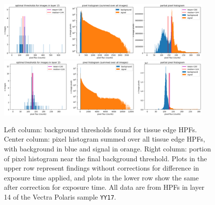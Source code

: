 \documentclass[letterpaper,11pt]{article}
\begin{document}
\begin{figure}[!ht]
\centering
\includegraphics[width=0.95\textwidth]{images/results/thresholding_pre_correction/YY17_layer_15_background_threshold_plots}
\includegraphics[width=0.95\textwidth]{images/results/thresholding_post_correction/YY17_layer_15_background_threshold_plots}
\caption{\footnotesize Left column: background thresholds found for tissue edge HPFs. Center column: pixel histogram summed over all tissue edge HPFs, with background in blue and signal in orange. Right column: portion of pixel histogram near the final background threshold. Plots in the upper row represent findings without corrections for difference in exposure time applied, and plots in the lower row show the same after correction for exposure time. All data are from HPFs in layer 14 of the Vectra Polaris sample \texttt{YY17}.}
\label{fig:background_threshold_impact_polaris_layer_15}
\end{figure}
\end{document}
